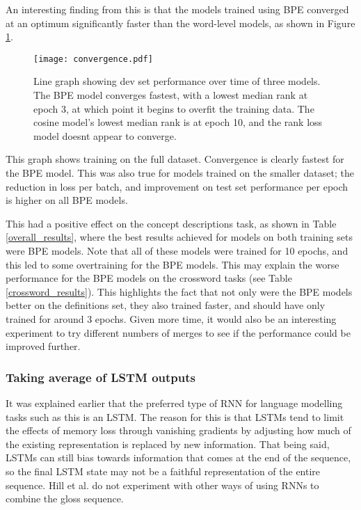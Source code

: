 \documentclass[11pt]{article}
\begin{document}
\begin{spacing}{1}
An interesting finding from this is that the models trained using BPE converged at an optimum significantly faster than the word-level models, as shown in Figure \ref{convergence}. 

\begin{figure}[!htpb]
\centering
\texttt{[image: convergence.pdf]}
\caption{Line graph showing dev set performance over time of three models. The BPE model converges fastest, with a lowest median rank at epoch 3, at which point it begins to overfit the training data. The cosine model's lowest median rank is at epoch 10, and the rank loss model doesnt appear to converge.}
\label{convergence}
\end{figure}

This graph shows training on the full dataset. Convergence is clearly fastest for the BPE model. This was also true for models trained on the smaller dataset; the reduction in loss per batch, and improvement on test set performance per epoch is higher on all BPE models. 

This had a positive effect on the concept descriptions task, as shown in Table \ref{overall_results}, where the best results achieved for models on both training sets were BPE models. Note that all of these models were trained for 10 epochs, and this led to some overtraining for the BPE models. This may explain the worse performance for the BPE models on the crossword tasks (see Table \ref{crossword_results}). This highlights the fact that not only were the BPE models better on the definitions set, they also trained faster, and should have only trained for around 3 epochs. Given more time, it would also be an interesting experiment to try different numbers of merges to see if the performance could be improved further.

\subsubsection{Taking average of LSTM outputs}
It was explained earlier that the preferred type of RNN for language modelling tasks such as this is an LSTM. The reason for this is that LSTMs tend to limit the effects of memory loss through vanishing gradients by adjusting how much of the existing representation is replaced by new information. That being said, LSTMs can still bias towards information that comes at the end of the sequence, so the final LSTM state may not be a faithful representation of the entire sequence. Hill et al. \citeyear{hill2015learning} do not experiment with other ways of using RNNs to combine the gloss sequence.


\end{spacing}
\end{document}
